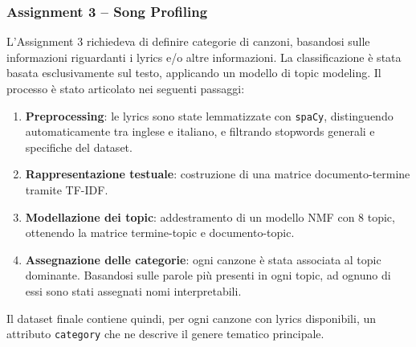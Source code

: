 \subsubsection*{Assignment 3 -- Song Profiling}
L'Assignment 3 richiedeva di definire categorie di canzoni,
basandosi sulle informazioni riguardanti i lyrics e/o altre informazioni.
La classificazione è stata basata esclusivamente sul testo, applicando
un modello di topic modeling.
Il processo è stato articolato nei seguenti passaggi:

\begin{enumerate}
    \item \textbf{Preprocessing}: le lyrics sono state lemmatizzate con
    \texttt{spaCy}, distinguendo automaticamente tra inglese e italiano,
    e filtrando stopwords generali e specifiche del dataset.
    
    \item \textbf{Rappresentazione testuale}: costruzione di una matrice
    documento-termine tramite TF-IDF.
    
    \item \textbf{Modellazione dei topic}: addestramento di un modello
    NMF con 8 topic, ottenendo la matrice termine-topic e
    documento-topic.
    
    \item \textbf{Assegnazione delle categorie}: ogni canzone è stata
    associata al topic dominante.
    Basandosi sulle parole più presenti in ogni topic, ad ognuno di essi
    sono stati assegnati nomi interpretabili.
\end{enumerate}

Il dataset finale contiene quindi, per ogni canzone con lyrics
disponibili, un attributo \texttt{category} che ne descrive il genere
tematico principale.